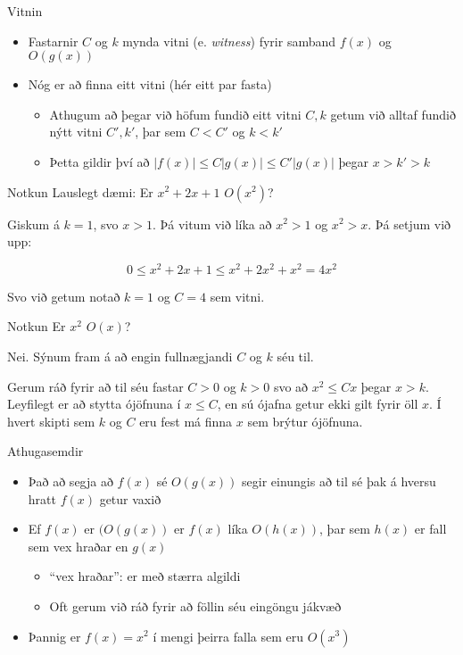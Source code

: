 \documentclass[handout]{beamer}
\begin{document}
\begin{frame}{Vitnin}
\begin{itemize}
 \item Fastarnir $C$ og $k$ mynda vitni (e. \emph{witness}) fyrir samband $f(x)$ og $O(g(x))$
 \item Nóg er að finna eitt vitni (hér eitt par fasta)
 \begin{itemize}
  \item Athugum að þegar við höfum fundið eitt vitni $C, k$ getum við alltaf fundið nýtt vitni $C', k'$, þar sem $C < C'$ og $k < k'$
  \item Þetta gildir því að $|f(x)| \leq C|g(x)| \leq C'|g(x)|$ þegar $x > k' > k$
 \end{itemize}
\end{itemize}
\end{frame}

\begin{frame}{Notkun}
Lauslegt dæmi: Er $x^2 + 2x + 1$ $O(x^2)$? \pause

Giskum á $k = 1$, svo $x > 1$. Þá vitum við líka að $x^2 > 1$ og $x^2 > x$. Þá setjum við upp:

\[
 0 \leq x^2 + 2x + 1 \leq x^2 + 2x^2 + x^2 = 4x^2
\]

Svo við getum notað $k = 1$ og $C = 4$ sem vitni.
\end{frame}

\begin{frame}{Notkun}
Er $x^2$ $O(x)$?\pause

Nei. Sýnum fram á að engin fullnægjandi $C$ og $k$ séu til.

Gerum ráð fyrir að til séu fastar $C > 0$ og $k > 0$ svo að $x^2 \leq C x$ þegar $x > k$. Leyfilegt er að stytta ójöfnuna í $x \leq C$, en sú ójafna getur ekki gilt fyrir öll $x$. Í hvert skipti sem $k$ og $C$ eru fest má finna $x$ sem brýtur ójöfnuna.
\end{frame}

\begin{frame}{Athugasemdir}
\begin{itemize}
 \item Það að segja að $f(x)$ sé $O(g(x))$ segir einungis að til sé þak á hversu hratt $f(x)$ getur vaxið
 \item Ef $f(x)$ er $(O(g(x))$ er $f(x)$ líka $O(h(x))$, þar sem $h(x)$ er fall sem vex hraðar en $g(x)$
 \begin{itemize}
  \item ``vex hraðar'': er með stærra algildi
  \item Oft gerum við ráð fyrir að föllin séu eingöngu jákvæð
 \end{itemize}
 \item Þannig er $f(x) = x^2$ í mengi þeirra falla sem eru $O(x^3)$
\end{itemize}
\end{frame}
\end{document}
